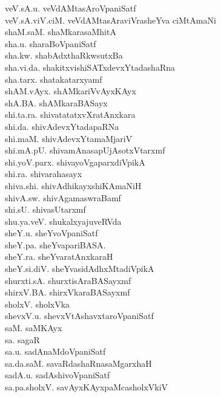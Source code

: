 {\begin{multicols}{2}
\begin{tabbing}
veV.sA.u. \> veVdAMtasAroVpaniSatf\\[2pt]
veV.sA.viV.ciM. \> veVdAMtasAraviVrasheYva ciMtAmaNi\\[2pt]
shaM.saM. \> shaMkarasaMhitA\\[2pt]
sha.u. \> sharaBoVpaniSatf\\[2pt]
sha.kw. \> shabAdxthaRkwsutxBa\\[2pt]
sha.vi.da. \> shakitxvishiSATxdevxYtadashaRna\\[2pt]
sha.tarx. \> shatakatarxyamf\\[2pt]
shAM.vAyx. \> shAMkariVvAyxKAyx\\[2pt]
shA.BA. \> shAMkaraBASayx\\[2pt]
shi.ta.ra. \> shivatatatxvXratAnxkara\\[2pt]
shi.da. \> shivAdevxYtadapaRNa\\[2pt]
shi.maM. \> shivAdevxYtamaMjariV\\[2pt]
shi.mA.pU. \> shivamAnasapUjAsotxVtarxmf\\[2pt]
shi.yoV.parx. \> shivayoVgaparxdiVpikA\\[2pt]
shi.ra. \> shivarahasayx\\[2pt]
shiva.shi. \> shivAdhikayxshiKAmaNiH\\[2pt]
shivA.sw. \> shivAgamaswraBamf\\[2pt]
shi.sU. \> shivasUtarxmf\\[2pt]
shu.ya.veV. \> shukalxyajuveRVda\\[2pt]
sheY.u. \> sheYvoVpaniSatf\\[2pt]
sheY.pa. \> sheYvapariBASA.\\[2pt]
sheY.ra. \> sheYvaratAnxkaraH\\[2pt]
sheY.si.diV. \> sheYvasidAdhxMtadiVpikA\\[2pt]
shurxti.sA. \> shurxtisAraBASayxmf\\[2pt]
shirxV.BA. \> shirxVkaraBASayxmf\\[2pt]
sholxV. \> sholxVka\\[2pt]
shevxV.u. \> shevxVtAshavxtaroVpaniSatf\\[2pt]
saM. \> saMKAyx\\[2pt]
sa. \> sagaR\\[2pt]
sa.u. \> sadAnaMdoVpaniSatf\\[2pt]
sa.da.saM. \> savaRdashaRnasaMgarxhaH\\[2pt]
sadA.u. \> sadAshivoVpaniSatf\\[2pt]
sa.pa.sholxV. \> savAyxKAyxpaMcasholxVkiV\\[2pt]

\end{tabbing}
\end{multicols}}
